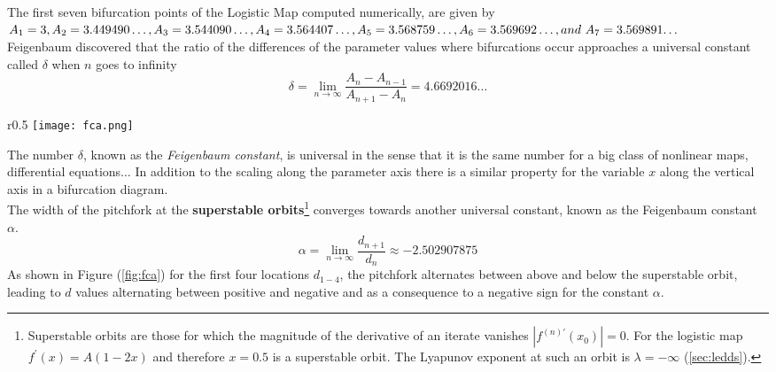 The first seven bifurcation points of the Logistic Map computed numerically, are given by \\
$A_1=3, A_2=3.449490\ldots, A_3=3.544090\ldots, A_4=3.564407\ldots, A_5=3.568759\ldots,
A_6=3.569692\ldots, and\\ \ A_7=3.569891{\ldots}$\\
Feigenbaum discovered that the ratio of the differences of the parameter values where bifurcations occur approaches a universal constant called $\delta$ when $n$ goes to infinity
\begin{equation}
	\delta=\lim_{n\rightarrow\infty}\frac{A_{n}-A_{n-1}}{A_{n+1}-A_n}=4.6692016\ldots
\end{equation}
\begin{wrapfigure}{r}{0.5\textwidth}
	\centering
	\texttt{[image: fca.png]}
	\caption{Universal scaling in the horizontal and vertical direction of a period doubling sequence.}
	\label{fig:fca}
\end{wrapfigure}
The number $\delta$, known as the \emph{Feigenbaum constant}, is universal in the sense that it is the same number for a big class of nonlinear maps, differential equations$\ldots$
In addition to the scaling along the parameter axis there is a similar property for the variable $x$ along the vertical axis in a bifurcation diagram.\\
The width of the pitchfork at the \textbf{superstable orbits}\footnote{Superstable orbits are those for which the magnitude of the derivative of an iterate vanishes $|f^{(n)\prime}(x_0)|=0$. For the logistic map $f^\prime(x)=A(1-2x)$ and therefore $x=0.5$ is a superstable orbit. The Lyapunov exponent at such an orbit is $\lambda=-\infty$ (\ref{sec:ledds}).} converges towards another universal constant, known as the Feigenbaum constant $\alpha$.
\begin{equation}
	\alpha=\lim_{n\rightarrow\infty}\frac{d_{n+1}}{d_n}\approx-2.502907875
\end{equation}
As shown in Figure (\ref{fig:fca}) for the first four locations $d_{1-4}$, the pitchfork alternates between above and below the superstable orbit, leading to $d$ values alternating between positive and negative and as a consequence to a negative sign for the constant $\alpha$.